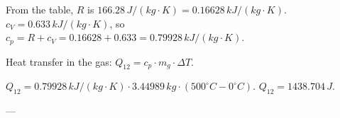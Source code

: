 From the table, \( R \) is \( 166.28 \, J/(kg·K) = 0.16628 \, kJ/(kg·K) \).  
\( c_V = 0.633 \, kJ/(kg·K) \), so \( c_p = R + c_V = 0.16628 + 0.633 = 0.79928 \, kJ/(kg·K) \).  

Heat transfer in the gas:  
\( Q_{12} = c_p \cdot m_g \cdot \Delta T \).  

\( Q_{12} = 0.79928 \, kJ/(kg·K) \cdot 3.44989 \, kg \cdot (500^\circ C - 0^\circ C) \).  
\( Q_{12} = 1438.704 \, J \).  

---